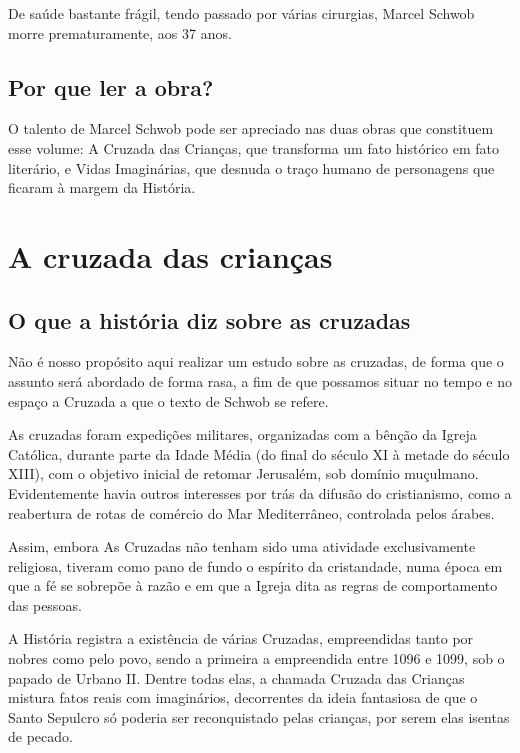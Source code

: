 \documentclass[12pt]{extarticle}
\begin{document}
De saúde bastante frágil, tendo passado por várias cirurgias, Marcel
Schwob morre prematuramente, aos 37 anos.

\subsection{Por que ler a obra?}

O talento de Marcel Schwob pode ser apreciado nas duas obras que
constituem esse volume: A Cruzada das Crianças, que transforma um fato
histórico em fato literário, e Vidas Imaginárias, que desnuda o traço
humano de personagens que ficaram à margem da História.

\section{A cruzada das crianças}


\subsection{O que a história diz sobre as cruzadas}

Não é nosso propósito aqui realizar um estudo sobre as cruzadas, de
forma que o assunto será abordado de forma rasa, a fim de que possamos
situar no tempo e no espaço a Cruzada a que o texto de Schwob se refere.

As cruzadas foram expedições militares, organizadas com a bênção da
Igreja Católica, durante parte da Idade Média (do final do século XI à
metade do século XIII), com o objetivo inicial de retomar Jerusalém, sob
domínio muçulmano. Evidentemente havia outros interesses por trás da
difusão do cristianismo, como a reabertura de rotas de comércio do Mar
Mediterrâneo, controlada pelos árabes.




Assim, embora As Cruzadas não tenham sido uma atividade exclusivamente
religiosa, tiveram como pano de fundo o espírito da cristandade, numa
época em que a fé se sobrepõe à razão e em que a Igreja dita as regras
de comportamento das pessoas.

A História registra a existência de várias Cruzadas, empreendidas tanto
por nobres como pelo povo, sendo a primeira a empreendida entre 1096 e
1099, sob o papado de Urbano II. Dentre todas elas, a chamada Cruzada
das Crianças mistura fatos reais com imaginários, decorrentes da ideia
fantasiosa de que o Santo Sepulcro só poderia ser reconquistado pelas
crianças, por serem elas isentas de pecado.
\end{document}
